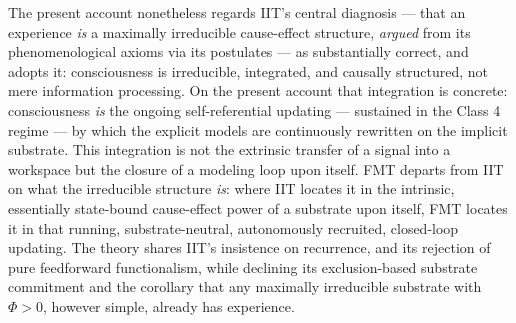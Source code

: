 \documentclass[12pt]{article}
\newcommand{\revstart}{}
\newcommand{\revend}{}
\begin{document}
{\revstart The present account nonetheless regards IIT's central diagnosis --- that an experience \emph{is} a maximally irreducible cause-effect structure, \emph{argued} from its phenomenological axioms via its postulates --- as substantially correct, and adopts it: consciousness is irreducible, integrated, and causally structured, not mere information processing. On the present account that integration is concrete: consciousness \emph{is} the ongoing self-referential updating --- sustained in the Class 4 regime --- by which the explicit models are continuously rewritten on the implicit substrate. This integration is not the extrinsic transfer of a signal into a workspace but the closure of a modeling loop upon itself. FMT departs from IIT on what the irreducible structure \emph{is}: where IIT locates it in the intrinsic, essentially state-bound cause-effect power of a substrate upon itself, FMT locates it in that running, substrate-neutral, autonomously recruited, closed-loop updating. The theory shares IIT's insistence on recurrence, and its rejection of pure feedforward functionalism, while declining its exclusion-based substrate commitment and the corollary that any maximally irreducible substrate with $\Phi > 0$, however simple, already has experience.\revend}
\end{document}
